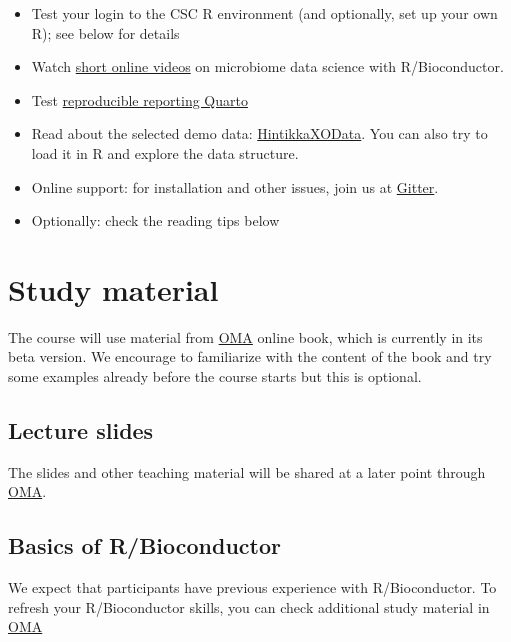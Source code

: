 \documentclass[
  oneside]{book}
\begin{document}
\begin{itemize}
\item
  Test your login to the CSC R environment (and optionally, set up your own R); see below for details
\item
  Watch \href{https://www.youtube.com/playlist?list=PLjiXAZO27elAJEptP59BN3whVJ61XIkST}{short online videos} on microbiome data science with R/Bioconductor.
\item
  Test \href{https://microbiome.github.io/OMA/resources.html\#quarto}{reproducible reporting Quarto}
\item
  Read about the selected demo data: \href{https://microbiome.github.io/OMA/containers.html\#hintikka-desc}{HintikkaXOData}. You can also try to load it in R and explore the data structure.
\item
  Online support: for installation and other issues, join us at \href{https://gitter.im/microbiome/miaverse?utm_source=badge\&utm_medium=badge\&utm_campaign=pr-badge\&utm_content=badge}{Gitter}.
\item
  Optionally: check the reading tips below
\end{itemize}

\hypertarget{material}{%
\section{Study material}\label{material}}

The course will use material from
\href{https://microbiome.github.io/OMA/}{OMA} online book, which is
currently in its beta version. We encourage to familiarize with the
content of the book and try some examples already before the course
starts but this is optional.

\hypertarget{lecture-slides}{%
\subsection{Lecture slides}\label{lecture-slides}}

The slides and other teaching material will be shared at a later
point through
\href{https://microbiome.github.io/OMA/training.html\#material}{OMA}.

\hypertarget{basics-of-rbioconductor}{%
\subsection{Basics of R/Bioconductor}\label{basics-of-rbioconductor}}

We expect that participants have previous experience with R/Bioconductor. To refresh your R/Bioconductor skills, you can check additional study material in \href{https://microbiome.github.io/OMA/docs/devel/pages/training.html}{OMA}
\end{document}
